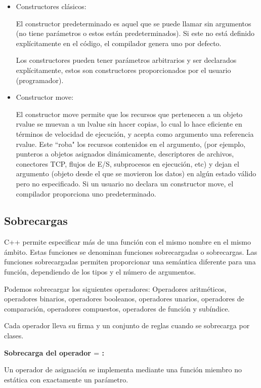 \documentclass[10pt]{article}
\begin{document}
\begin{itemize}
	\item Constructores cl\'asicos:
	
	El constructor predeterminado es aquel que se puede llamar sin argumentos (no tiene parámetros o estos est\'an predeterminados). Si este no está definido explícitamente en el código, el compilador genera uno por defecto.
	
	Los constructores pueden tener parámetros arbitrarios y ser declarados expl\'icitamente, estos son constructores proporcionados por el usuario (programador).
	
	\item Constructor move:
	 
	El constructor move permite que los recursos que pertenecen a un objeto rvalue se muevan a un lvalue sin hacer copias, lo cual lo hace eficiente en términos de velocidad de ejecución, y acepta como argumento una referencia rvalue. Este ``roba" los recursos contenidos en el argumento, (por ejemplo, punteros a objetos asignados dinámicamente, descriptores de archivos, conectores TCP, flujos de E/S, subprocesos en ejecución, etc) y dejan el argumento (objeto desde el que se movieron los datos) en algún estado válido pero no especificado. Si un usuario no declara un constructor move, el compilador proporciona uno predeterminado.	
\end{itemize}

\subsection{Sobrecargas}

C++ permite especificar más de una función con el mismo nombre en el mismo ámbito. Estas funciones se denominan funciones sobrecargadas o sobrecargas. Las funciones sobrecargadas permiten proporcionar una semántica diferente para una función, dependiendo de los tipos y el número de argumentos. 

Podemos sobrecargar los siguientes operadores: Operadores aritméticos, operadores binarios, operadores booleanos, operadores unarios, operadores de comparación, operadores compuestos, operadores de función y subíndice.

Cada operador lleva su firma y un conjunto de reglas cuando se sobrecarga por clases.

\vspace{0.5em}
\textbf{Sobrecarga del operador $ \textbf{=} $ :}

Un operador de asignación se implementa mediante una función miembro no estática con exactamente un parámetro.
\end{document}
